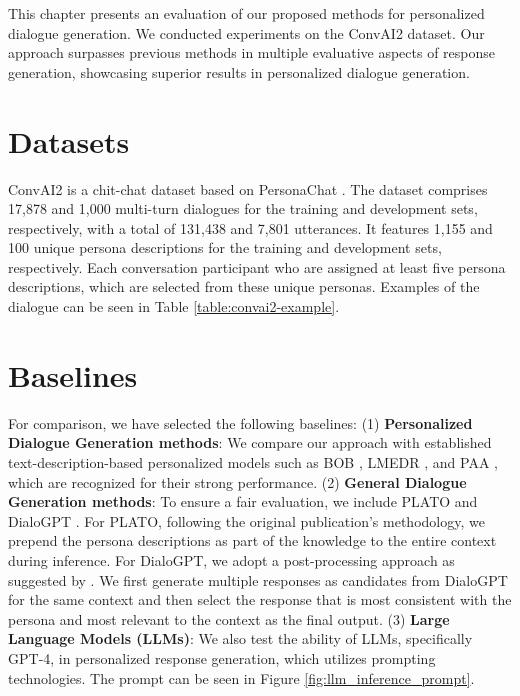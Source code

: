 This chapter presents an evaluation of our proposed methods for personalized dialogue generation. We conducted experiments on the ConvAI2 dataset. Our approach surpasses previous methods in multiple evaluative aspects of response generation, showcasing superior results in personalized dialogue generation.

\section{Datasets}
ConvAI2 \cite{dinan-etal-2019-convai2} is a chit-chat dataset based on PersonaChat \cite{zhang-etal-2018-personalizing}. The dataset comprises 17,878 and 1,000 multi-turn dialogues for the training and development sets, respectively, with a total of 131,438 and 7,801 utterances. It features 1,155 and 100 unique persona descriptions for the training and development sets, respectively. Each conversation participant who are assigned at least five persona descriptions, which are selected from these unique personas. Examples of the dialogue can be seen in Table \ref{table:convai2-example}.

\section{Baselines}
For comparison, we have selected the following baselines: (1) \textbf{Personalized Dialogue Generation methods}: We compare our approach with established text-description-based personalized models such as BOB \cite{song-etal-2021-bob}, LMEDR \cite{chen-etal-2023-memorize}, and PAA \cite{huang-etal-2023-paa}, which are recognized for their strong performance. (2) \textbf{General Dialogue Generation methods}: To ensure a fair evaluation, we include PLATO \cite{bao-etal-2020-plato} and DialoGPT \cite{zhang-etal-2019-dialogpt}. For PLATO, following the original publication's methodology, we prepend the persona descriptions as part of the knowledge to the entire context during inference. For DialoGPT, we adopt a post-processing approach as suggested by \cite{zhou-etal-2023-simoap}. We first generate multiple responses as candidates from DialoGPT for the same context and then select the response that is most consistent with the persona and most relevant to the context as the final output. (3) \textbf{Large Language Models (LLMs)}: We also test the ability of LLMs, specifically GPT-4, in personalized response generation, which utilizes prompting technologies. The prompt can be seen in Figure \ref{fig:llm_inference_prompt}.

